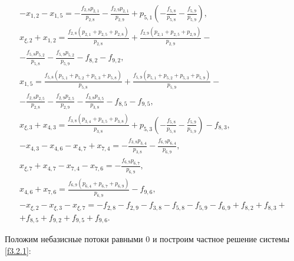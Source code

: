 \documentclass[14pt]{extarticle}%
\begin{document}
\begin{equation}\begin{gathered}\label{f3.2.1}
-x_{1,2}-x_{1,5}=-\frac{f_{2,8} p_{2,1}}{p_{2,8}}-\frac{f_{2,9} p_{2,1}}{p_{2,9}}+p_{5,1} \left(-\frac{f_{5,8}}{p_{5,8}}-\frac{f_{5,9}}{p_{5,9}}\right),\\
    x_{\xi ,2}+x_{1,2}=\frac{f_{2,8} \left(p_{2,1}+p_{2,5}+p_{2,8}\right)}{p_{2,8}}+\frac{f_{2,9} \left(p_{2,1}+p_{2,5}+p_{2,9}\right)}{p_{2,9}}-\\-\frac{f_{5,8} p_{5,2}}{p_{5,8}}-\frac{f_{5,9} p_{5,2}}{p_{5,9}}-f_{8,2}-f_{9,2},\\
    x_{1,5}=\frac{f_{5,8} \left(p_{5,1}+p_{5,2}+p_{5,3}+p_{5,8}\right)}{p_{5,8}}+\frac{f_{5,9} \left(p_{5,1}+p_{5,2}+p_{5,3}+p_{5,9}\right)}{p_{5,9}}-\\-\frac{f_{2,8} p_{2,5}}{p_{2,8}}-\frac{f_{2,9} p_{2,5}}{p_{2,9}}-\frac{f_{3,8} p_{3,5}}{p_{3,8}}-f_{8,5}-f_{9,5},\\
    x_{\xi ,3}+x_{4,3}=\frac{f_{3,8} \left(p_{3,4}+p_{3,5}+p_{3,8}\right)}{p_{3,8}}+p_{5,3} \left(-\frac{f_{5,8}}{p_{5,8}}-\frac{f_{5,9}}{p_{5,9}}\right)-f_{8,3},\\
    -x_{4,3}-x_{4,6}-x_{4,7}+x_{7,4}=-\frac{f_{3,8} p_{3,4}}{p_{3,8}}-\frac{f_{6,9} p_{6,4}}{p_{6,9}},\\
    x_{\xi ,7}+x_{4,7}-x_{7,4}-x_{7,6}=-\frac{f_{6,9} p_{6,7}}{p_{6,9}},\\
    x_{4,6}+x_{7,6}=\frac{f_{6,9} \left(p_{6,4}+p_{6,7}+p_{6,9}\right)}{p_{6,9}}-f_{9,6},\\
    -x_{\xi ,2}-x_{\xi ,3}-x_{\xi ,7}=-f_{2,8}-f_{2,9}-f_{3,8}-f_{5,8}-f_{5,9}-f_{6,9}+f_{8,2}+f_{8,3}+\\+f_{8,5}+f_{9,2}+f_{9,5}+f_{9,6}.
    \end{gathered}
\end{equation}

Положим небазисные потоки равными 0 и построим частное решение системы \eqref{f3.2.1}:
\end{document}
